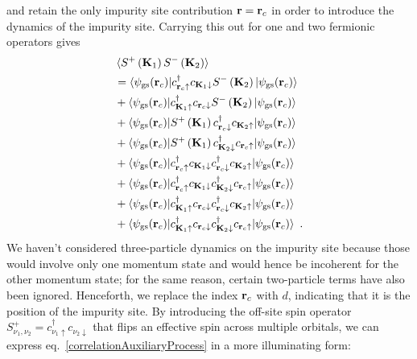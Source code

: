 \documentclass[reprint,hidelinks]{revtex4-2}
\begin{document}
and retain the only impurity site contribution \({\bf r}={\bf r}_c\) in order to introduce the dynamics of the impurity site. Carrying this out for one and two fermionic operators gives
\begin{equation}\begin{aligned}\label{correlationAuxiliaryProcess}
	&\braket{S^+\left({\bf K}_1\right)S^-\left({\bf K}_2\right)} \\
	&= \braket{\psi_\text{gs}({\bf r}_c) | c^\dagger_{{\bf r}_c \uparrow} c_{{\bf K}_1 \downarrow} S^-\left({\bf K}_2\right) | \psi_\text{gs}({\bf r}_c)}\\
	&+ \braket{\psi_\text{gs}({\bf r}_c) | c^\dagger_{{\bf K}_1 \uparrow} c_{{\bf r}_c \downarrow} S^-\left({\bf K}_2\right) | \psi_\text{gs}({\bf r}_c)}\\
	&+ \braket{\psi_\text{gs}({\bf r}_c) | S^+\left({\bf K}_1\right) c^\dagger_{{\bf r}_c \downarrow} c_{{\bf K}_2 \uparrow} | \psi_\text{gs}({\bf r}_c)}\\
	&+ \braket{\psi_\text{gs}({\bf r}_c) | S^+\left({\bf K}_1\right) c^\dagger_{{\bf K}_2 \downarrow} c_{{\bf r}_c \uparrow} | \psi_\text{gs}({\bf r}_c)}\\
	&+ \braket{\psi_\text{gs}({\bf r}_c) | c^\dagger_{{\bf r}_c \uparrow} c_{{\bf K}_1 \downarrow} c^\dagger_{{\bf r}_c \downarrow} c_{{\bf K}_2 \uparrow} | \psi_\text{gs}({\bf r}_c)}\\
	&+ \braket{\psi_\text{gs}({\bf r}_c) | c^\dagger_{{\bf r}_c \uparrow} c_{{\bf K}_1 \downarrow} c^\dagger_{{\bf K}_2 \downarrow} c_{{\bf r}_c \uparrow} | \psi_\text{gs}({\bf r}_c)}\\
	&+ \braket{\psi_\text{gs}({\bf r}_c) | c^\dagger_{{\bf K}_1 \uparrow} c_{{\bf r}_c \downarrow} c^\dagger_{{\bf r}_c \downarrow} c_{{\bf K}_2 \uparrow} | \psi_\text{gs}({\bf r}_c)}\\
	&+ \braket{\psi_\text{gs}({\bf r}_c) | c^\dagger_{{\bf K}_1 \uparrow} c_{{\bf r}_c \downarrow} c^\dagger_{{\bf K}_2 \downarrow} c_{{\bf r}_c \uparrow} | \psi_\text{gs}({\bf r}_c)}~.
\end{aligned}\end{equation}
We haven't considered three-particle dynamics on the impurity site because those would involve only one momentum state and would hence be incoherent for the other momentum state; for the same reason, certain two-particle terms have also been ignored. Henceforth, we replace the index \({\bf r}_c\) with \(d\), indicating that it is the position of the impurity site. By introducing the off-site spin operator \(S^+_{\nu_1,\nu_2} = c^\dagger_{\nu_1 \uparrow} c_{\nu_2 \downarrow}\) that flips an effective spin across multiple orbitals, we can express eq.~\ref{correlationAuxiliaryProcess} in a more illuminating form:
\end{document}
